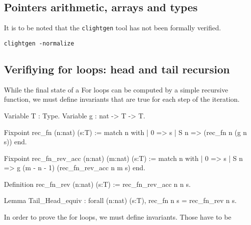 \subsection{Pointers arithmetic, arrays and types}


It is to be noted that the \texttt{clightgen} tool has not been formally verified.

\texttt{clightgen -normalize}

%
%
%

\subsection{Verifiying for loops: head and tail recursion}

While the final state of a For loops can be computed by a simple recursive function,
we must define invariants that are true for each step of the iteration.

\begin{Coq}
Variable T : Type.
Variable g : nat -> T -> T.

Fixpoint rec_fn (n:nat) (s:T) :=
  match n with
  | 0 => s
  | S n => (rec_fn n (g n s))
  end.

Fixpoint rec_fn_rev_acc (n:nat) (m:nat) (s:T) :=
  match n with
  | 0 => s
  | S n => g (m - n - 1) (rec_fn_rev_acc n m s)
  end.

Definition rec_fn_rev (n:nat) (s:T) :=
  rec_fn_rev_acc n n s.

Lemma Tail_Head_equiv :
  forall (n:nat) (s:T),
  rec_fn n s = rec_fn_rev n s.
\end{Coq}


In order to prove the for loops, we must define invariants.
Those have to be


